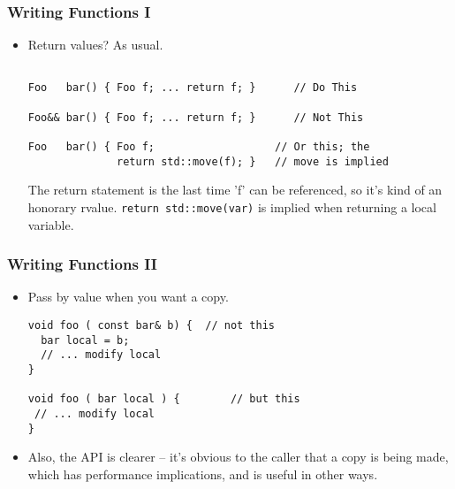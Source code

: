 
\begin{frame}[fragile]
\frametitle{Writing Functions I}
\begin{itemize}
\item Return values?  As usual.
{\scriptsize
\begin{verbatim}

Foo   bar() { Foo f; ... return f; }      // Do This

Foo&& bar() { Foo f; ... return f; }      // Not This

Foo   bar() { Foo f;                   // Or this; the
              return std::move(f); }   // move is implied

\end{verbatim}
}
The return statement is the last time 'f' can be referenced,
so it's kind of an honorary rvalue.
\vskip 6pt
\texttt{return std::move(var)} is implied when returning a local variable.

\end{itemize}

\end{frame}



\begin{frame}[fragile]
\frametitle{Writing Functions II}
\begin{itemize}
\item Pass by value when you want a copy.
{\scriptsize
\begin{verbatim}
void foo ( const bar& b) {  // not this
  bar local = b;
  // ... modify local
}

void foo ( bar local ) {        // but this
 // ... modify local 
}
\end{verbatim}
}
\pause
\begin{center}
\end{center}
\item Also, the API is clearer -- it's obvious to the caller that a
copy is being made, which has performance implications, and is useful
in other ways.
\begin{center}
\end{center}
\end{itemize}

\end{frame}


